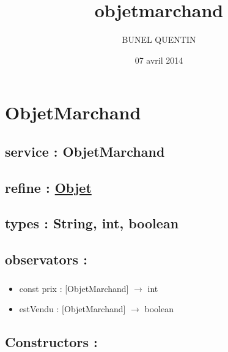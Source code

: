 \documentclass[11pt]{article}
\title{objetmarchand}
\author{BUNEL QUENTIN}
\date{07 avril 2014}
\begin{document}
\maketitle

\setcounter{tocdepth}{3}
\tableofcontents
\vspace*{1cm}
\section{ObjetMarchand}
\label{sec-1}

\subsection{service : ObjetMarchand}
\label{sec-1.1}

\subsection{refine : \href{file:///users/Etu5/3000675/Desktop/spec/objet.org}{Objet}}
\label{sec-1.2}

\subsection{types : String, int, boolean}
\label{sec-1.3}



\subsection{observators :}
\label{sec-1.4}

\subsubsection{}

\begin{itemize}

\item const prix : [ObjetMarchand] $\to$ int\\
\label{sec-1.4.1.1}


\item estVendu : [ObjetMarchand] $\to$ boolean\\
\label{sec-1.4.1.2}



\end{itemize} %
\subsection{Constructors :}
\label{sec-1.5}
\end{document}
